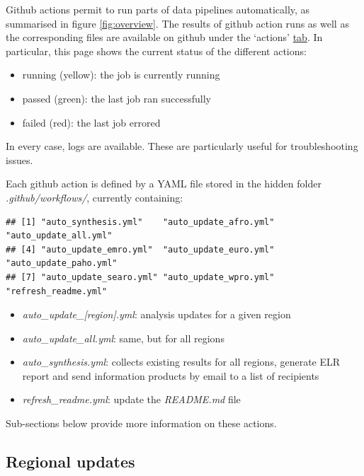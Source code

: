 \documentclass[]{book}
\providecommand{\tightlist}{%
  \setlength{\itemsep}{0pt}\setlength{\parskip}{0pt}}
\begin{document}
Github actions permit to run parts of data pipelines automatically, as
summarised in figure \ref{fig:overview}. The results of github action runs as
well as the corresponding files are available on github under the `actions'
\href{https://github.com/whocov/trend_analysis_public/actions}{tab}. In particular,
this page shows the current status of the different actions:

\begin{itemize}
\tightlist
\item
  running (yellow): the job is currently running
\item
  passed (green): the last job ran successfully
\item
  failed (red): the last job errored
\end{itemize}

In every case, logs are available. These are particularly useful for
troubleshooting issues.

Each github action is defined by a YAML file stored in the hidden folder
\emph{.github/workflows/}, currently containing:

\begin{verbatim}
## [1] "auto_synthesis.yml"    "auto_update_afro.yml"  "auto_update_all.yml"  
## [4] "auto_update_emro.yml"  "auto_update_euro.yml"  "auto_update_paho.yml" 
## [7] "auto_update_searo.yml" "auto_update_wpro.yml"  "refresh_readme.yml"
\end{verbatim}

\begin{itemize}
\tightlist
\item
  \emph{auto\_update\_{[}region{]}.yml}: analysis updates for a given region
\item
  \emph{auto\_update\_all.yml}: same, but for all regions
\item
  \emph{auto\_synthesis.yml}: collects existing results for all regions, generate ELR
  report and send information products by email to a list of recipients
\item
  \emph{refresh\_readme.yml}: update the \emph{README.md} file
\end{itemize}

Sub-sections below provide more information on these actions.

\hypertarget{regional-updates}{%
\subsection{Regional updates}\label{regional-updates}}
\end{document}
